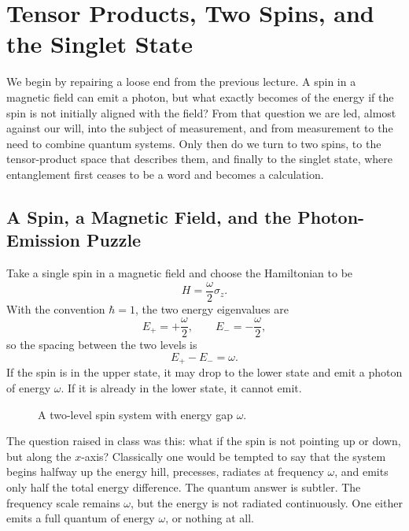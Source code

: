 \chapter{Tensor Products, Two Spins, and the Singlet State}

We begin by repairing a loose end from the previous lecture. A spin in a magnetic field can emit a photon, but what exactly becomes of the energy if the spin is not initially aligned with the field? From that question we are led, almost against our will, into the subject of measurement, and from measurement to the need to combine quantum systems. Only then do we turn to two spins, to the tensor-product space that describes them, and finally to the singlet state, where entanglement first ceases to be a word and becomes a calculation.

\section{A Spin, a Magnetic Field, and the Photon-Emission Puzzle}

Take a single spin in a magnetic field and choose the Hamiltonian to be
\begin{equation}
H=\frac{\omega}{2}\sigma_z.
\end{equation}
With the convention \(\hbar=1\), the two energy eigenvalues are
\begin{equation}
E_+=+\frac{\omega}{2},
\qquad
E_-=-\frac{\omega}{2},
\end{equation}
so the spacing between the two levels is
\begin{equation}
E_+-E_-=\omega.
\end{equation}
If the spin is in the upper state, it may drop to the lower state and emit a photon of energy \(\omega\). If it is already in the lower state, it cannot emit.

\begin{figure}[ht]
\centering
{}
\caption{A two-level spin system with energy gap \(\omega\).}
\end{figure}

The question raised in class was this: what if the spin is not pointing up or down, but along the \(x\)-axis? Classically one would be tempted to say that the system begins halfway up the energy hill, precesses, radiates at frequency \(\omega\), and emits only half the total energy difference. The quantum answer is subtler. The frequency scale remains \(\omega\), but the energy is not radiated continuously. One either emits a full quantum of energy \(\omega\), or nothing at all.

